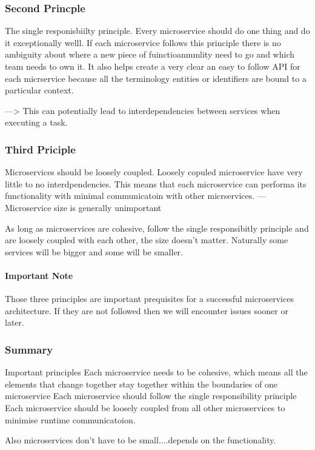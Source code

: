 \documentclass[a4paper, 11pt]{book}
\begin{document}
    \subsubsection{Second Princple}
    The single responisbiilty principle.
    Every microservice should do one thing and do it exceptionally welll.
    If each microservice follows this principle there is no ambiguity about where a new piece of fuinctioanmmlity need to go and which team needs to own it.
    It also helps create a very clear an easy to follow API for each micrservice because all the terminology entities or identifiers are bound to a particular context.

    ---> This can potentially lead to interdependencies between services when executing a task.

    \subsubsection{Third Priciple}
    Microservices should be loosely coupled.
    Loosely copuled microservice have very little to no interdpendencies.
    This means that each microservice can performa its functionality with minimal communicatoin with other micrservices.
    --- Microservice size is generally unimportant

    As long as microservices are cohesive, follow the single responsibitly principle and are loosely coupled with each other, the size doesn't matter.
    Naturally some services will be bigger and some will be smaller.

    \paragraph{Important Note}
    Those three principles are important prequisites for a successful microservices architecture.
    If they are not followed then we will encounter issues sooner or later.

    \subsubsection{Summary}
    Important principles
    Each microservice needs to be cohesive, which means all the elements that change together stay together within the boundaries of one microservice
    Each microservice should follow the single responsibility principle
    Each microservice should be loosely coupled from all other microservices to minimise runtime communicatoion.

    Also microservices don't have to be small....depends on the functionality.
\end{document}
